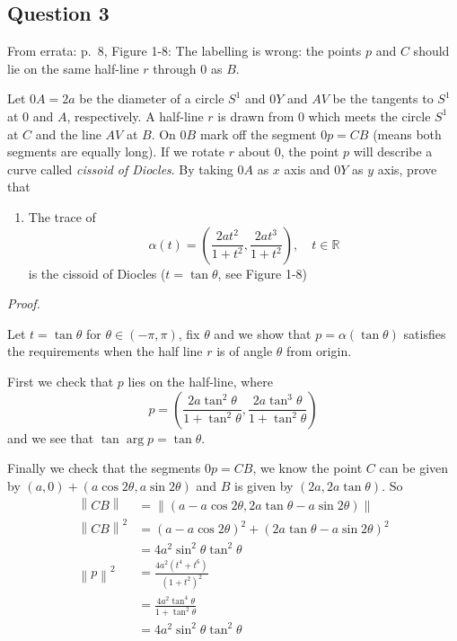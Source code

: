 \documentclass[12pt]{article}
\begin{document}
\subsection*{Question 3}

From errata: p.~8, Figure 1-8: The labelling is wrong: the points \(p\)
and \(C\) should lie on the same half-line \(r\) through \(0\) as \(B\).

Let \(0A = 2a\) be the diameter of a circle \(S^1\) and \(0Y\) and
\(AV\) be the tangents to \(S^1\) at \(0\) and \(A\), respectively. A
half-line \(r\) is drawn from \(0\) which meets the circle \(S^1\) at
\(C\) and the line \(AV\) at \(B\). On \(0B\) mark off the segment
\(0p = CB\) (means both segments are equally long). If we rotate \(r\)
about \(0\), the point \(p\) will describe a curve called \emph{cissoid
of Diocles}. By taking \(0A\) as \(x\) axis and \(0Y\) as \(y\) axis,
prove that

\begin{enumerate}
\def\labelenumi{\alph{enumi}.}
\item
  The trace of
  \[ \alpha(t) = \left( \frac{2at^2}{1+t^2}, \frac{2at^3}{1+t^2} \right) ,\quad t\in\mathbb{R} \]
  is the cissoid of Diocles (\(t = \tan\theta\), see Figure 1-8)
\end{enumerate}

\emph{Proof.}

Let \(t = \tan\theta\) for \(\theta \in (-\pi,\pi)\), fix \(\theta\) and
we show that \(p = \alpha(\tan\theta)\) satisfies the requirements when
the half line \(r\) is of angle \(\theta\) from origin.

First we check that \(p\) lies on the half-line, where
\[ p = \left( \frac{2a\tan^2\theta}{1+\tan^2\theta}, \frac{2a\tan^3\theta}{1+\tan^2\theta} \right) \]
and we see that \(\tan\arg p = \tan\theta\).

Finally we check that the segments \(0p = CB\), we know the point \(C\)
can be given by \((a,0) + (a \cos 2\theta, a \sin 2\theta)\) and \(B\)
is given by \((2a, 2a\tan\theta )\). So \begin{align*}
\left\lVert CB \right\rVert &= \left\lVert \left(  a - a\cos 2\theta, 2a\tan\theta - a\sin 2\theta  \right) \right\rVert \\
\left\lVert CB \right\rVert^2 &=
(a - a\cos2\theta)^2 + (2a\tan\theta - a\sin2\theta)^2 \\
&= 4a^2\sin^2\theta\tan^2\theta \\
\left\lVert p \right\rVert^2 &= \frac{4a^2(t^4 + t^6)}{(1+t^2)^2} \\
&= \frac{4a^2 \tan^4\theta}{1+\tan^2\theta} \\
&= 4a^2\sin^2\theta\tan^2\theta
\end{align*}
\end{document}
